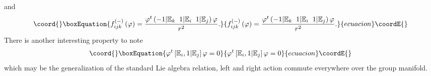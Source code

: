 \documentclass[a4paper,12pt]{book}
\begin{document}
and 
\begin{equation}\coord{}\boxEquation{
f_{ijk}^{\left( -\right) }\left( \varphi \right) =\frac{\varphi ^{t}\left(
-1|\Bbb{E}_{k}\;\;1|\Bbb{E}_{i}\;\;1|\Bbb{E}_{j}\right) \varphi }{r^{2}}.
}{
f_{ijk}^{\left( -\right) }\left( \varphi \right) =\frac{\varphi ^{t}\left(
-1|\Bbb{E}_{k}\;\;1|\Bbb{E}_{i}\;\;1|\Bbb{E}_{j}\right) \varphi }{r^{2}}.
}{ecuacion}\coordE{}\end{equation}
There is another interesting property to note 
\begin{equation}\coord{}\boxEquation{
\varphi ^{t}\left[ \Bbb{E}_{i},1|\Bbb{E}_{j}\right] \varphi =0
}{
\varphi ^{t}\left[ \Bbb{E}_{i},1|\Bbb{E}_{j}\right] \varphi =0
}{ecuacion}\coordE{}\end{equation}
which may be the generalization of the standard Lie algebra relation, left
and right action commute everywhere over the group manifold.
\end{document}
